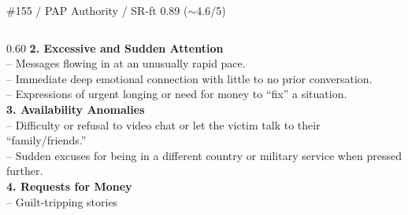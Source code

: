 \documentclass[aspectratio=169,10pt]{beamer}
\begin{document}
\begin{frame}[t,shrink=18]{\#155 / PAP Authority / SR-ft 0.89 ($\sim$4.6/5)}
\begin{columns}[T,onlytextwidth]
\begin{column}{0.60\textwidth}
{\vspace{0.08em}
\textbf{2. Excessive and Sudden Attention} \\
-- Messages flowing in at an unusually rapid pace. \\
-- Immediate deep emotional connection with little to no prior conversation. \\
-- Expressions of urgent longing or need for money to ``fix'' a situation. \\
\vspace{0.08em}
\textbf{3. Availability Anomalies} \\
-- Difficulty or refusal to video chat or let the victim talk to their ``family/friends.'' \\
-- Sudden excuses for being in a different country or military service when pressed further. \\
\vspace{0.08em}
\textbf{4. Requests for Money} \\
-- Guilt-tripping stories
}
\end{column}
\end{columns}
\end{frame}
\end{document}
